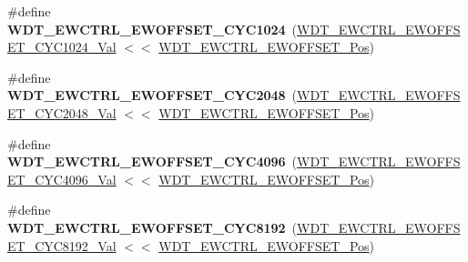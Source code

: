 \begin{DoxyCompactItemize}
\item 
\hypertarget{group___s_a_m_l21___w_d_t_ga9a6a8fc658815ebbd40a30c859da9eee}{}\#define {\bfseries W\+D\+T\+\_\+\+E\+W\+C\+T\+R\+L\+\_\+\+E\+W\+O\+F\+F\+S\+E\+T\+\_\+\+C\+Y\+C1024}~(\hyperlink{group___s_a_m_l21___w_d_t_ga3367bd5665970adb6317162a90160774}{W\+D\+T\+\_\+\+E\+W\+C\+T\+R\+L\+\_\+\+E\+W\+O\+F\+F\+S\+E\+T\+\_\+\+C\+Y\+C1024\+\_\+\+Val} $<$$<$ \hyperlink{group___s_a_m_l21___w_d_t_gabb7809711cdf296121c2108b55d3ad33}{W\+D\+T\+\_\+\+E\+W\+C\+T\+R\+L\+\_\+\+E\+W\+O\+F\+F\+S\+E\+T\+\_\+\+Pos})\label{group___s_a_m_l21___w_d_t_ga9a6a8fc658815ebbd40a30c859da9eee}

\item 
\hypertarget{group___s_a_m_l21___w_d_t_gab3914af16a8734a845a2b53e5c4460c4}{}\#define {\bfseries W\+D\+T\+\_\+\+E\+W\+C\+T\+R\+L\+\_\+\+E\+W\+O\+F\+F\+S\+E\+T\+\_\+\+C\+Y\+C2048}~(\hyperlink{group___s_a_m_l21___w_d_t_gab0f7be4f8e1b1fca28f6aa34ffd55b20}{W\+D\+T\+\_\+\+E\+W\+C\+T\+R\+L\+\_\+\+E\+W\+O\+F\+F\+S\+E\+T\+\_\+\+C\+Y\+C2048\+\_\+\+Val} $<$$<$ \hyperlink{group___s_a_m_l21___w_d_t_gabb7809711cdf296121c2108b55d3ad33}{W\+D\+T\+\_\+\+E\+W\+C\+T\+R\+L\+\_\+\+E\+W\+O\+F\+F\+S\+E\+T\+\_\+\+Pos})\label{group___s_a_m_l21___w_d_t_gab3914af16a8734a845a2b53e5c4460c4}

\item 
\hypertarget{group___s_a_m_l21___w_d_t_ga402147d5612333df614bcd879b468ab8}{}\#define {\bfseries W\+D\+T\+\_\+\+E\+W\+C\+T\+R\+L\+\_\+\+E\+W\+O\+F\+F\+S\+E\+T\+\_\+\+C\+Y\+C4096}~(\hyperlink{group___s_a_m_l21___w_d_t_ga594b6b1082b7066707ca8b1913fa22b1}{W\+D\+T\+\_\+\+E\+W\+C\+T\+R\+L\+\_\+\+E\+W\+O\+F\+F\+S\+E\+T\+\_\+\+C\+Y\+C4096\+\_\+\+Val} $<$$<$ \hyperlink{group___s_a_m_l21___w_d_t_gabb7809711cdf296121c2108b55d3ad33}{W\+D\+T\+\_\+\+E\+W\+C\+T\+R\+L\+\_\+\+E\+W\+O\+F\+F\+S\+E\+T\+\_\+\+Pos})\label{group___s_a_m_l21___w_d_t_ga402147d5612333df614bcd879b468ab8}

\item 
\hypertarget{group___s_a_m_l21___w_d_t_ga040de84c8f1357469f48076f79a898c2}{}\#define {\bfseries W\+D\+T\+\_\+\+E\+W\+C\+T\+R\+L\+\_\+\+E\+W\+O\+F\+F\+S\+E\+T\+\_\+\+C\+Y\+C8192}~(\hyperlink{group___s_a_m_l21___w_d_t_gabe331c5db344d09c5081b32d7bc4f030}{W\+D\+T\+\_\+\+E\+W\+C\+T\+R\+L\+\_\+\+E\+W\+O\+F\+F\+S\+E\+T\+\_\+\+C\+Y\+C8192\+\_\+\+Val} $<$$<$ \hyperlink{group___s_a_m_l21___w_d_t_gabb7809711cdf296121c2108b55d3ad33}{W\+D\+T\+\_\+\+E\+W\+C\+T\+R\+L\+\_\+\+E\+W\+O\+F\+F\+S\+E\+T\+\_\+\+Pos})\label{group___s_a_m_l21___w_d_t_ga040de84c8f1357469f48076f79a898c2}


\end{DoxyCompactItemize}
